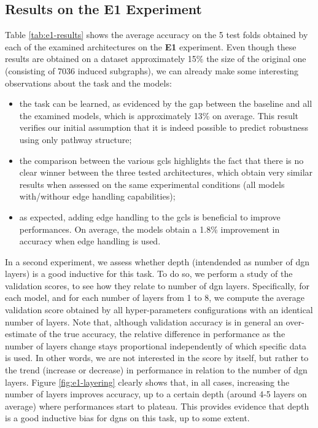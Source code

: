 \subsection{Results on the E1 Experiment}
Table \ref{tab:e1-results} shows the average accuracy on the 5 test folds obtained by each of the examined architectures on the \textbf{E1} experiment. Even though these results are obtained on a dataset approximately 15\% the size of the original one (consisting of 7036 induced subgraphs), we can already make some interesting observations about the task and the models:
\begin{itemize}
    \item the task can be learned, as evidenced by the gap between the baseline and all the examined models, which is approximately 13\% on average. This result verifies our initial assumption that it is indeed possible to predict robustness using only pathway structure;
    \item the comparison between the various \glspl{gcl} highlights the fact that there is no clear winner between the three tested architectures, which obtain very similar results when assessed on the same experimental conditions (\ie all models with/withour edge handling capabilities);
    \item as expected, adding edge handling to the \glspl{gcl} is beneficial to improve performances. On average, the models obtain a 1.8\% improvement in accuracy when edge handling is used.
\end{itemize}



In a second experiment, we assess whether depth (intendended as number of \gls{dgn} layers) is a good inductive for this task. To do so, we perform a \posthoc study of the validation scores, to see how they relate to number of \gls{dgn} layers. Specifically, for each model, and for each number of layers from 1 to 8, we compute the average validation score obtained by all hyper-parameters configurations with an identical number of layers. Note that, although validation accuracy is in general an over-estimate of the true accuracy, the relative difference in performance as the number of layers change stays proportional independently of which specific data is used. In other words, we are not interested in the score by itself, but rather to the trend (increase or decrease) in performance in relation to the number of \gls{dgn} layers. Figure \ref{fig:e1-layering} clearly shows that, in all cases, increasing the number of layers improves accuracy, up to a certain depth (around 4-5 layers on average) where performances start to plateau. This provides evidence that depth is a good inductive bias for \glspl{dgn} on this task, up to some extent.


